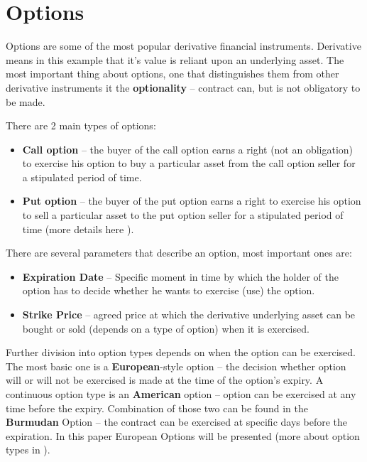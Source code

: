 \section{Options}
    Options are some of the most popular derivative financial instruments. Derivative means in this example that it's value is reliant upon an underlying asset. The most important thing about options, one that distinguishes them from other derivative instruments it the \textbf{optionality} -- contract can, but is not obligatory to be made.
    
    There are 2 main types of options:
    \begin{itemize}
        \item \textbf{Call option} -- the buyer of the call option earns a right (not an obligation) to exercise his option to buy a particular asset from the call option seller for a stipulated period of time.
        \item \textbf{Put option} -- the buyer of the put option earns a right to exercise his option to sell a particular asset to the put option seller for a stipulated period of time (more details here \cite{Call_Put_Option_Definition}).
    \end{itemize}
    
    There are several parameters that describe an option, most important ones are:
    \begin{itemize}
        \item \textbf{Expiration Date} -- Specific moment in time by which the holder of the option has to decide whether he wants to exercise (use) the option.
        \item \textbf{Strike Price} -- agreed price at which the derivative underlying asset can be bought or sold (depends on a type of option) when it is exercised.
    \end{itemize}
    Further division into option types depends on when the option can be exercised. The most basic one is a \textbf{European}-style option -- the decision whether option will or will not be exercised is made at the time of the option's expiry. A continuous option type is an \textbf{American} option -- option can be exercised at any time before the expiry. Combination of those two can be found in the \textbf{Burmudan} Option -- the contract can be exercised at specific days before the expiration. In this paper European Options will be presented (more about option types in \cite{Option_Types}).
    

